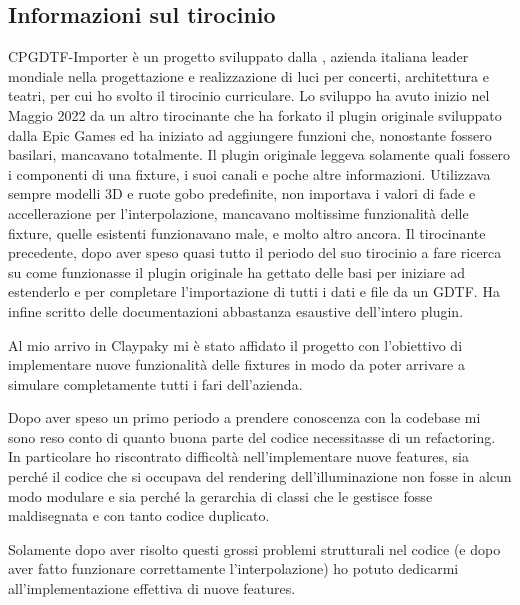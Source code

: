 \documentclass[main.tex]{subfiles}
\begin{document}
\subsection{Informazioni sul tirocinio}\label{subsec:1_tirocinio}
CPGDTF-Importer è un progetto sviluppato dalla , azienda italiana leader mondiale nella progettazione e realizzazione di luci per concerti, architettura e teatri, per cui ho svolto il tirocinio curriculare. Lo sviluppo ha avuto inizio nel Maggio 2022 da un altro tirocinante che ha forkato il plugin originale sviluppato dalla Epic Games ed ha iniziato ad aggiungere funzioni che, nonostante fossero basilari, mancavano totalmente. Il plugin originale leggeva solamente quali fossero i componenti di una fixture, i suoi canali e poche altre informazioni. Utilizzava sempre modelli 3D e ruote gobo predefinite, non importava i valori di fade e accellerazione per l'interpolazione, mancavano moltissime funzionalità delle fixture, quelle esistenti funzionavano male, e molto altro ancora. Il tirocinante precedente, dopo aver speso quasi tutto il periodo del suo tirocinio a fare ricerca su come funzionasse il plugin originale ha gettato delle basi per iniziare ad estenderlo e per completare l'importazione di tutti i dati e file da un GDTF. Ha infine scritto delle documentazioni abbastanza esaustive dell'intero plugin.\newline

Al mio arrivo in Claypaky mi è stato affidato il progetto con l'obiettivo di implementare nuove funzionalità delle fixtures in modo da poter arrivare a simulare completamente tutti i fari dell'azienda.

Dopo aver speso un primo periodo a prendere conoscenza con la codebase mi sono reso conto di quanto buona parte del codice necessitasse di un refactoring. In particolare ho riscontrato difficoltà nell'implementare nuove features, sia perché il codice che si occupava del rendering dell'illuminazione non fosse in alcun modo modulare e sia perché la gerarchia di classi che le gestisce fosse maldisegnata e con tanto codice duplicato. 

Solamente dopo aver risolto questi grossi problemi strutturali nel codice (e dopo aver fatto funzionare correttamente l'interpolazione) ho potuto dedicarmi all'implementazione effettiva di nuove features. 

\end{document}
